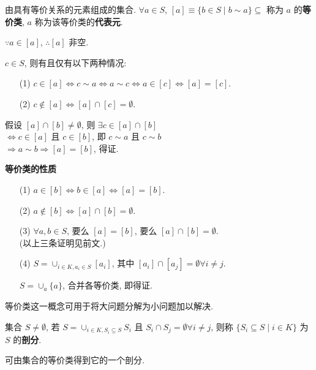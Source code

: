 \documentclass{note}
\begin{document}
\begin{df}[等价类]
    由具有等价关系的元素组成的集合. $\forall a\in S$, $[a]\equiv\{b\in S\mid b\sim a\}\subseteq$ 称为 $a$ 的\textbf{等价类}, $a$ 称为该等价类的\textbf{代表元}.
\end{df}

$\because a\in[a]$, $\therefore[a]$ 非空.

$c\in S$, 则有且仅有以下两种情况:
\begin{itemize}
    \item[(1)] $c\in[a]\Longleftrightarrow c\sim a\Longleftrightarrow a\sim c\Longleftrightarrow a\in[c]\Longleftrightarrow[a]=[c]$.
    \item[(2)] $c\notin[a]\Longleftrightarrow[a]\cap[c]=\emptyset$.
\end{itemize}
\begin{pf}
    假设 $[a]\cap[b]\neq\emptyset$, 则 $\exists c\in[a]\cap[b]$\\
    $\Longleftrightarrow c\in[a]$ 且 $c\in[b]$, 即 $c\sim a$ 且 $c\sim b$\\
    $\Longrightarrow a\sim b\Longrightarrow[a]=[b]$, 得证.
\end{pf}

\textbf{等价类的性质}
\begin{itemize}
    \item[(1)] $a\in[b]\Longleftrightarrow b\in[a]\Longleftrightarrow[a]=[b]$.
    \item[(2)] $a\notin[b]\Longleftrightarrow[a]\cap[b]=\emptyset$.
    \item[(3)] $\forall a,b\in S$, 要么 $[a]=[b]$, 要么 $[a]\cap[b]=\emptyset$.\\
    (以上三条证明见前文.)
    \item[(4)] $S=\cup_{i\in K,a_i\in S}[a_i]$, 其中 $[a_i]\cap[a_j]=\emptyset\forall i\neq j$.
    \begin{pf}
        $S=\cup_a\{a\}$, 合并各等价类, 即得证.
    \end{pf}
\end{itemize}

等价类这一概念可用于将大问题分解为小问题加以解决.

\begin{df}[剖分]
    集合 $S\neq\emptyset$, 若 $S=\cup_{i\in K,S_i\subseteq S}S_i$ 且 $S_i\cap S_j=\emptyset\forall i\neq j$, 则称 $\{S_i\subseteq S\mid i\in K\}$ 为 $S$ 的\textbf{剖分}.
\end{df}

可由集合的等价类得到它的一个剖分.
\end{document}
